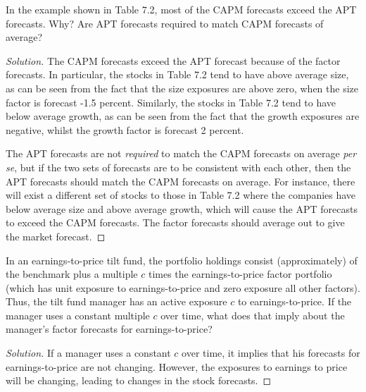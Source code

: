 \begin{problem}{7.3}
 In the example shown in Table 7.2, most of the CAPM forecasts exceed the APT forecasts. Why? Are APT forecasts required to match CAPM forecasts of average?
\end{problem}

\begin{proof}[Solution]
 The CAPM forecasts exceed the APT forecast because of the factor forecasts. In particular, the stocks in Table 7.2 tend to have above average size, as can be seen from the fact that the size exposures are above zero, when the size factor is forecast -1.5 percent. Similarly, the stocks in Table 7.2 tend to have below average growth, as can be seen from the fact that the growth exposures are negative, whilst the growth factor is forecast 2 percent.

 The APT forecasts are not \emph{required} to match the CAPM forecasts on average \emph{per se}, but if the two sets of forecasts are to be consistent with each other, then the APT forecasts should match the CAPM forecasts on average. For instance, there will exist a different set of stocks to those in Table 7.2 where the companies have below average size and above average growth, which will cause the APT forecasts to exceed the CAPM forecasts. The factor forecasts should average out to give the market forecast.
\end{proof}

\begin{problem}{7.4}
 In an earnings-to-price tilt fund, the portfolio holdings consist (approximately) of the benchmark plus a multiple $c$ times the earnings-to-price factor portfolio (which has unit exposure to earnings-to-price and zero exposure all other factors). Thus, the tilt fund manager has an active exposure $c$ to earnings-to-price. If the manager uses a constant multiple $c$ over time, what does that imply about the manager's factor forecasts for earnings-to-price?
\end{problem}

\begin{proof}[Solution]
  If a manager uses a constant $c$ over time, it implies that his forecasts for earnings-to-price are not changing. However, the exposures to earnings to price will be changing, leading to changes in the stock forecasts.
\end{proof}


